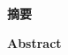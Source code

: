 \cleardoublepage
\begin{center}
    \bfseries {} 摘要
\end{center}

\cleardoublepage
\begin{center}
    \bfseries {} Abstract
\end{center}